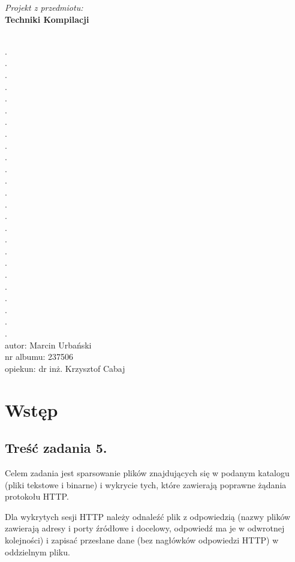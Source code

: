 \documentclass[a4paper,11pt]{report}
\author{Marcin Urbański, nr indeksu 237506}
\begin{document}
\begin{titlepage}
\begin{center}
\begin{Huge}
	\emph{Projekt z przedmiotu:}
	\\
	\textbf{Techniki Kompilacji}
\end{Huge}
\begin{normalsize}
	\\.\\.\\.\\.\\.\\.\\.\\.\\.\\.\\.\\.\\.
	\\.\\.\\.\\.\\.\\.\\.\\.\\.\\.\\.\\.\\
	autor: Marcin Urbański
	\\
	nr albumu: 237506
	\\
	opiekun: dr inż. Krzysztof Cabaj
\end{normalsize}		
\end{center}
\end{titlepage}


\chapter{Wstęp}

\section{Treść zadania 5.}

Celem zadania jest sparsowanie plików znajdujących się w podanym katalogu (pliki tekstowe i
binarne) i wykrycie tych, które zawierają poprawne żądania protokołu HTTP. 

Dla wykrytych sesji HTTP
należy odnaleźć plik z odpowiedzią (nazwy plików zawierają adresy i porty źródłowe i docelowy,
odpowiedź ma je w odwrotnej kolejności) i zapisać przesłane dane (bez nagłówków odpowiedzi
HTTP) w oddzielnym pliku. 
\end{document}
